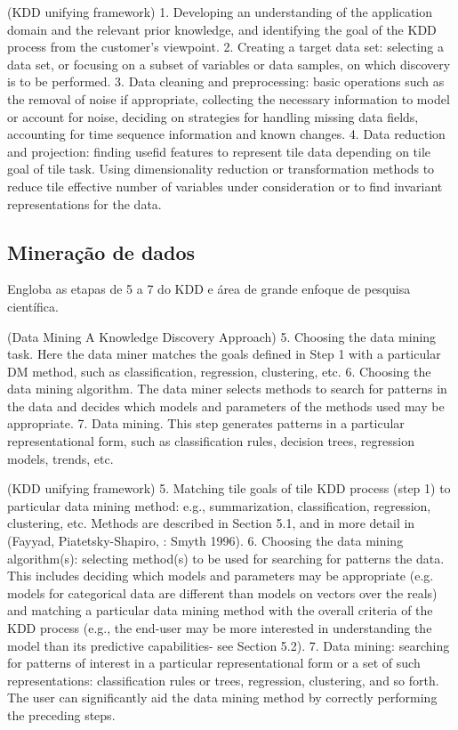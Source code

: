 (KDD unifying framework)
1. Developing an understanding of the application domain and the relevant prior knowledge, and identifying the goal of the KDD process from the customer’s viewpoint.
2. Creating a target data set: selecting a data set, or focusing on a subset of variables or data samples, on which discovery is to be performed.
3. Data cleaning and preprocessing: basic operations such as the removal of noise if appropriate, collecting the necessary information to model or account for noise, deciding on strategies for handling missing data fields, accounting for time sequence information and known changes.
4. Data reduction and projection: finding usefid features to represent tile data depending on tile goal of tile task. Using dimensionality reduction or transformation methods to reduce tile effective number of variables under consideration or to find invariant representations for the data.

\subsection{Mineração de dados}
\label{subsec:mineKDD}

Engloba as etapas de 5 a 7 do KDD e área de grande enfoque de pesquisa científica.

(Data Mining A Knowledge Discovery Approach)
5. Choosing the data mining task. Here the data miner matches the goals defined in Step 1 with a particular DM method, such as classification, regression, clustering, etc.
6. Choosing the data mining algorithm. The data miner selects methods to search for patterns in the data and decides which models and parameters of the methods used may be appropriate.
7. Data mining. This step generates patterns in a particular representational form, such as classification rules, decision trees, regression models, trends, etc.

(KDD unifying framework)
5. Matching tile goals of tile KDD process (step 1) to particular data mining method: e.g., summarization, classification, regression, clustering, etc. Methods are described in Section 5.1, and in more detail in (Fayyad, Piatetsky-Shapiro, : Smyth 1996).
6. Choosing the data mining algorithm(s): selecting method(s) to be used for searching for patterns the data. This includes deciding which models and parameters may be appropriate (e.g. models for categorical data are different than models on vectors over the reals) and matching a particular data mining method with the overall criteria of the KDD process (e.g., the end-user may be more interested in understanding the model than its predictive capabilities- see Section 5.2).
7. Data mining: searching for patterns of interest in a particular representational form or a set of such representations: classification rules or trees, regression, clustering, and so forth. The user can significantly aid the data mining method by correctly performing the preceding steps.


